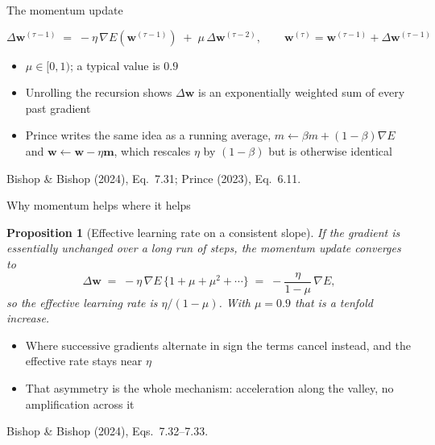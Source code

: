 \documentclass[aspectratio=169, 11pt]{beamer}
\newtheorem{propx}[theorem]{Proposition}
\newcommand{\srcline}[1]{%
  \par\vspace{0.25em}%
  {\scriptsize\color{mcMuted}\hfill #1\par}}
\newcommand{\src}[3]{}      %
\begin{document}
\begin{frame}{The momentum update}
  \src{bishop2024}{equation}{7.31}
  \src{bishop2024}{section}{7.3.1}
  \src{prince2023}{equation}{6.11}
  \src{prince2023}{section}{6.3}
  \vspace{-0.3em}
  \[
    \Delta \mathbf{w}^{(\tau-1)}
      \;=\; -\eta\,\nabla E\!\left(\mathbf{w}^{(\tau-1)}\right)
            \;+\; \mu\,\Delta \mathbf{w}^{(\tau-2)},
    \qquad
    \mathbf{w}^{(\tau)} = \mathbf{w}^{(\tau-1)} + \Delta \mathbf{w}^{(\tau-1)}
  \]
  \vspace{-0.7em}
  \begin{itemize}\itemsep0.35em
    \item $\mu \in [0, 1)$; a typical value is $0.9$
    \item Unrolling the recursion shows $\Delta \mathbf{w}$ is an exponentially
          weighted sum of \alert{every} past gradient
    \item Prince writes the same idea as a running average,
          $m \leftarrow \beta m + (1-\beta)\nabla E$ and
          $\mathbf{w} \leftarrow \mathbf{w} - \eta \mathbf{m}$, which rescales $\eta$ by
          $(1-\beta)$ but is otherwise identical
  \end{itemize}
  \srcline{Bishop \& Bishop (2024), Eq.~7.31; Prince (2023), Eq.~6.11.}
\end{frame}

\begin{frame}{Why momentum helps where it helps}
  \src{bishop2024}{equation}{7.32-7.33}
  \src{bishop2024}{section}{7.3.1}
  \vspace{-0.25em}
  \begin{propx}[Effective learning rate on a consistent slope]\label{th:mom}
    \small
    If the gradient is essentially unchanged over a long run of steps,
    the momentum update converges to
    \[
      \Delta \mathbf{w} \;=\; -\eta\,\nabla E\,\{1 + \mu + \mu^2 + \cdots\}
                \;=\; -\frac{\eta}{1-\mu}\,\nabla E ,
    \]
    so the effective learning rate is $\eta/(1-\mu)$. With $\mu = 0.9$
    that is a tenfold increase.
  \end{propx}
  \vspace{0.3em}
  \begin{itemize}\itemsep0.35em
    \item Where successive gradients \alert{alternate} in sign the terms
          cancel instead, and the effective rate stays near $\eta$
    \item That asymmetry is the whole mechanism: acceleration along the
          valley, no amplification across it
  \end{itemize}
  \srcline{Bishop \& Bishop (2024), Eqs.~7.32--7.33.}
\end{frame}
\end{document}
